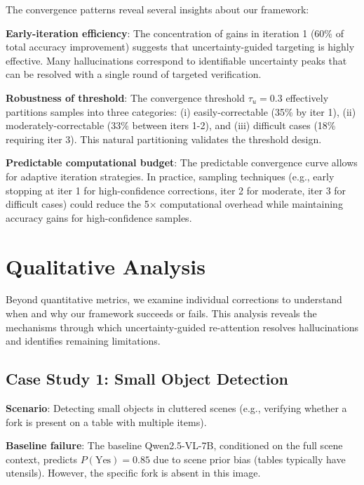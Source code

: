 \documentclass[12pt]{article}
\begin{document}
The convergence patterns reveal several insights about our framework:

\textbf{Early-iteration efficiency}: The concentration of gains in iteration 1 (60\% 
of total accuracy improvement) suggests that uncertainty-guided targeting is highly 
effective. Many hallucinations correspond to identifiable uncertainty peaks that can 
be resolved with a single round of targeted verification.

\textbf{Robustness of threshold}: The convergence threshold $\tau_u = 0.3$ effectively 
partitions samples into three categories: (i) easily-correctable (35\% by iter 1), 
(ii) moderately-correctable (33\% between iters 1-2), and (iii) difficult cases 
(18\% requiring iter 3). This natural partitioning validates the threshold design.

\textbf{Predictable computational budget}: The predictable convergence curve allows 
for adaptive iteration strategies. In practice, sampling techniques (e.g., early 
stopping at iter 1 for high-confidence corrections, iter 2 for moderate, iter 3 
for difficult cases) could reduce the 5× computational overhead while maintaining 
accuracy gains for high-confidence samples.


\section{Qualitative Analysis}

Beyond quantitative metrics, we examine individual corrections to understand when 
and why our framework succeeds or fails. This analysis reveals the mechanisms 
through which uncertainty-guided re-attention resolves hallucinations and identifies 
remaining limitations.

\subsection{Case Study 1: Small Object Detection}

\textbf{Scenario}: Detecting small objects in cluttered scenes (e.g., verifying 
whether a fork is present on a table with multiple items).

\textbf{Baseline failure}: The baseline Qwen2.5-VL-7B, conditioned on the full 
scene context, predicts $P(\text{Yes}) = 0.85$ due to scene prior bias (tables 
typically have utensils). However, the specific fork is absent in this image.
\end{document}
